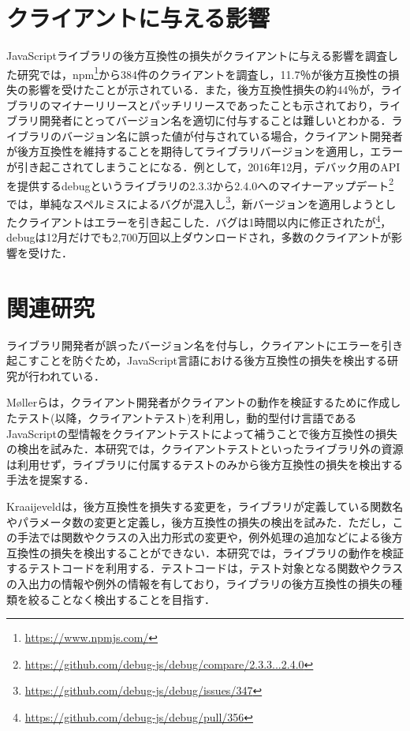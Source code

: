 \documentclass[11pt,dvipdfmx]{jreport}
\begin{document}
\section{クライアントに与える影響}
JavaScriptライブラリの後方互換性の損失がクライアントに与える影響を調査した研究\cite{impact-analysis-for-clients}では，npm\footnote{\url{https://www.npmjs.com/}}から384件のクライアントを調査し，11.7％が後方互換性の損失の影響を受けたことが示されている．また，後方互換性損失の約44％が，ライブラリのマイナーリリースとパッチリリースであったことも示されており，ライブラリ開発者にとってバージョン名を適切に付与することは難しいとわかる．ライブラリのバージョン名に誤った値が付与されている場合，クライアント開発者が後方互換性を維持することを期待してライブラリバージョンを適用し，エラーが引き起こされてしまうことになる．例として，2016年12月，デバック用のAPIを提供するdebugというライブラリの2.3.3から2.4.0へのマイナーアップデート\footnote{\url{https://github.com/debug-js/debug/compare/2.3.3...2.4.0}}では，単純なスペルミスによるバグが混入し\footnote{\url{https://github.com/debug-js/debug/issues/347}}，新バージョンを適用しようとしたクライアントはエラーを引き起こした．バグは1時間以内に修正されたが\footnote{\url{https://github.com/debug-js/debug/pull/356}}，debugは12月だけでも2,700万回以上ダウンロードされ，多数のクライアントが影響を受けた．

\section{関連研究}
ライブラリ開発者が誤ったバージョン名を付与し，クライアントにエラーを引き起こすことを防ぐため，JavaScript言語における後方互換性の損失を検出する研究が行われている．

Møllerらは，クライアント開発者がクライアントの動作を検証するために作成したテスト(以降，クライアントテスト)を利用し，動的型付け言語であるJavaScriptの型情報をクライアントテストによって補うことで後方互換性の損失の検出を試みた\cite{type-regression-testing}\cite{model-based-testing}．本研究では，クライアントテストといったライブラリ外の資源は利用せず，ライブラリに付属するテストのみから後方互換性の損失を検出する手法を提案する．

Kraaijeveldは，後方互換性を損失する変更を，ライブラリが定義している関数名やパラメータ数の変更と定義し，後方互換性の損失の検出を試みた\cite{detecting-breaking-changes-in-js-apis}．ただし，この手法では関数やクラスの入出力形式の変更や，例外処理の追加などによる後方互換性の損失を検出することができない．本研究では，ライブラリの動作を検証するテストコードを利用する．テストコードは，テスト対象となる関数やクラスの入出力の情報や例外の情報を有しており，ライブラリの後方互換性の損失の種類を絞ることなく検出することを目指す．
\end{document}

